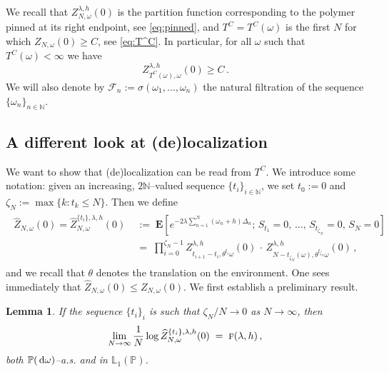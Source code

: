 \documentclass[reqno,11pt]{amsart}
\numberwithin{equation}{section}
\newtheorem{lemma}[theorem]{Lemma}
\newcommand{\N}{\mathbb{N}}
\newcommand{\cF}{{\ensuremath{\mathcal F}} }
\newcommand{\bE}{{\ensuremath{\mathbf E}} }
\newcommand{\dd}{\,\text{\rm d}}             %
\newcommand{\bbL}{{\ensuremath{\mathbb L}} }
\newcommand{\bbP}{{\ensuremath{\mathbb P}} }
\newcommand{\go}{\omega}
\newcommand{\gl}{\lambda}
\newcommand{\gs}{\sigma}
\newcommand{\tf}{\textsc{f}}
\begin{document}
We recall that $Z_{N,\go}^{\gl,h}(0)$ is the partition function corresponding to the polymer pinned at its right endpoint, see \eqref{eq:pinned}, and $T^C=T^{C}(\go)$ is the first $N$ for which $Z_{N,\go}(0)\ge C$, see \eqref{eq:T^C}. In particular, for all $\go$ such that $T^C(\go) < \infty$ we have
\begin{equation} \label{eq:stopping_maj}
Z_{T^C(\go),\go}^{\gl,h}(0) \ge C\,.
\end{equation}
We will also denote by $\cF_n := \gs(\go_1,\ldots,\go_n)$ the natural filtration of the sequence $\{\go_n\}_{n\in\N}$.

\smallskip

\subsection{A different look at (de)localization}
We want to show that (de)localization can be read from $T^C$. We introduce some notation: given an increasing, $2\N$--valued sequence $\{t_i\}_{i\in\N}$, we set $t_0:=0$ and $\zeta_N:=\max\{k: t_k \le N\}$. Then we  define
\begin{align} \label{eq:low_b}
\begin{split}
\widehat{Z}_{N,\go}(0) = \widehat{Z}_{N,\go}^{\{t_i\},\gl,h}(0) & \;:=\; \bE \left[ e^{-2 \gl \sum_{n=1}^N \left( \go_n +h\right) \Delta_n}; \, S_{t_1}=0,\, \ldots,\, S_{t_{\zeta_N}}=0,\, S_N= 0 \right] \\
&\;=\; \prod_{i=0}^{\zeta_N-1} Z_{t_{i+1}-t_i,\theta^{t_i}\go}^{\gl,h}(0) \,\cdot\, Z_{N-t_{\zeta_N}(\go),\theta^{t_{\zeta_N}}\go}^{\gl,h}(0)\,,
\end{split}
\end{align}
and we recall that $\theta$ denotes the translation on the environment.
One sees immediately that $\widehat{Z}_{N,\go}(0)\le Z_{N,\go}(0)$.
We first establish a preliminary result.

\begin{lemma} \label{lem:chop}
If the sequence $\{t_i\}_i$ is such that $\zeta_N/N \to 0$ as $N\to\infty$, then
\begin{equation}
\lim_{N\to\infty} \frac 1N \log \widehat{Z}_{N,\go}^{\{t_i\},\gl,h}(0) \;=\; \tf(\gl,h)\,,
\end{equation}
both $\bbP(\dd\go)$--a.s. and in $\bbL_1(\bbP)$.
\end{lemma}
\end{document}
